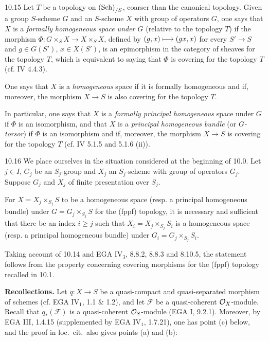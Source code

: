 \begin{definition}{10.15}\label{VIB.10.15}
Let $T$ be a topology on $\textup{(Sch)}_{/S}$, coarser than the canonical topology. Given a group $S$-scheme $G$ and an $S$-scheme $X$ with group of operators $G$, one says that $X$ is a \emph{formally homogeneous space under $G$} (relative to the topology $T$) if the morphism $\Phi:G\times_S X\to X\times_S X$, defined by $(g,x)\longmapsto(gx,x)$ for every $S'\to S$ and $g\in G(S')$, $x\in X(S')$, is an epimorphism in the category of sheaves for the topology $T$, which is equivalent to saying that $\Phi$ is covering for the topology $T$ (cf. IV 4.4.3).

One says that $X$ is a \emph{homogeneous} space if it is formally homogeneous and if, moreover, the morphism $X\to S$ is also covering for the topology $T$.

In particular, one says that $X$ is a \emph{formally principal homogeneous} space under $G$ if $\Phi$ is an isomorphism, and that $X$ is a \emph{principal homogeneous bundle} (or \emph{$G$-torsor}) if $\Phi$ is an isomorphism and if, moreover, the morphism $X\to S$ is covering for the topology $T$ (cf. IV 5.1.5 and 5.1.6 (ii)).
\end{definition}

\begin{proposition}{10.16}\label{VIB.10.16}
We place ourselves in the situation considered at the beginning of 10.0. Let $j\in I$, $G_j$ be an $S_j$-group and $X_j$ an $S_j$-scheme with group of operators $G_j$. Suppose $G_j$ and $X_j$ of finite presentation over $S_j$.

For $X=X_j\times_{S_j}S$ to be a homogeneous space (resp. a principal homogeneous bundle) under $G=G_j\times_{S_j}S$ for the (fppf) topology, it is necessary and sufficient that there be an index $i\geq j$ such that $X_i=X_j\times_{S_j}S_i$ is a homogeneous space (resp. a principal homogeneous bundle) under $G_i=G_j\times_{S_j}S_i$.
\end{proposition}
Taking account of 10.14 and EGA IV$_3$, 8.8.2, 8.8.3 and 8.10.5, the statement follows from the property concerning covering morphisms for the (fppf) topology recalled in 10.1.

\label{VIB.11.0}\textbf{Recollections.}
Let $q:X\to S$ be a quasi-compact and quasi-separated morphism of schemes (cf. EGA IV$_1$, 1.1 \& 1.2), and let $\mathscr F$ be a quasi-coherent $\mathcal{O}_X$-module. Recall that $q_*(\mathscr F)$ is a quasi-coherent $\mathcal{O}_S$-module (EGA I, 9.2.1). Moreover, by EGA III, 1.4.15 (supplemented by EGA IV$_1$, 1.7.21), one has point (c) below, and the proof in loc.\ cit.\ also gives points (a) and (b):

